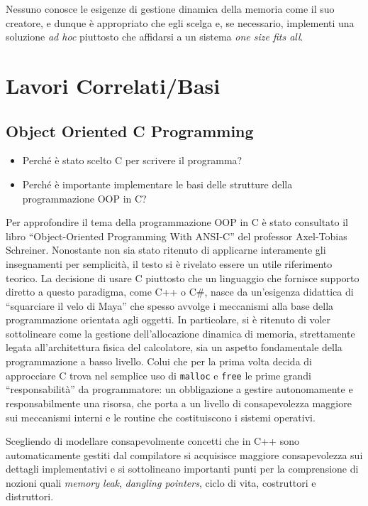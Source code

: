 \documentclass[noexaminfo]{sapthesis}
\begin{document}
Nessuno conosce le esigenze di gestione dinamica della memoria come il suo creatore, e dunque è appropriato che egli scelga e, se necessario, implementi una soluzione \textit{ad hoc} piuttosto che affidarsi a un sistema \textit{one size fits all}.

\chapter{Lavori Correlati/Basi}
\section{Object Oriented C Programming}
\begin{itemize}
  \item Perché è stato scelto C per scrivere il programma?
  \item Perché è importante implementare le basi delle strutture della programmazione OOP in C?
\end{itemize}

Per approfondire il tema della programmazione OOP in C è stato consultato il libro ``Object-Oriented Programming With ANSI-C'' del professor Axel-Tobias Schreiner. Nonostante non sia stato ritenuto di applicarne interamente gli insegnamenti per semplicità, il testo si è rivelato essere un utile riferimento teorico. La decisione di usare C piuttosto che un linguaggio che fornisce supporto diretto a questo paradigma, come C++ o C\#, nasce da un’esigenza didattica di ``squarciare il velo di Maya'' che spesso avvolge i meccanismi alla base della programmazione orientata agli oggetti. In particolare, si è ritenuto di voler sottolineare come la gestione dell’allocazione dinamica di memoria, strettamente legata all’architettura fisica del calcolatore, sia un aspetto fondamentale della programmazione a basso livello. Colui che per la prima volta decida di approcciare C trova nel semplice uso di \texttt{malloc} e \texttt{free} le prime grandi ``responsabilità'' da programmatore: un obbligazione a gestire autonomamente e responsabilmente una risorsa, che porta a un livello di consapevolezza maggiore sui meccanismi interni e le routine che costituiscono i sistemi operativi.

Scegliendo di modellare consapevolmente concetti che in C++ sono automaticamente gestiti dal compilatore si acquisisce maggiore consapevolezza sui dettagli implementativi e si sottolineano importanti punti per la comprensione di nozioni quali \textit{memory leak}, \textit{dangling pointers}, ciclo di vita, costruttori e distruttori.
\end{document}
